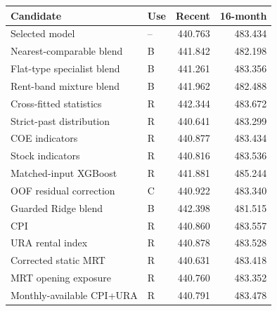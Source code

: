 \begin{tabular}{llrr}
\toprule
Candidate & Use & Recent & 16-month \\
\midrule
Selected model & -- & 440.763 & 483.434 \\
Nearest-comparable blend & B & 441.842 & 482.198 \\
Flat-type specialist blend & B & 441.261 & 483.356 \\
Rent-band mixture blend & B & 441.962 & 482.488 \\
Cross-fitted statistics & R & 442.344 & 483.672 \\
Strict-past distribution & R & 440.641 & 483.299 \\
COE indicators & R & 440.877 & 483.434 \\
Stock indicators & R & 440.816 & 483.536 \\
Matched-input XGBoost & R & 441.881 & 485.244 \\
OOF residual correction & C & 440.922 & 483.340 \\
Guarded Ridge blend & B & 442.398 & 481.515 \\
CPI & R & 440.860 & 483.557 \\
URA rental index & R & 440.878 & 483.528 \\
Corrected static MRT & R & 440.631 & 483.418 \\
MRT opening exposure & R & 440.760 & 483.352 \\
Monthly-available CPI+URA & R & 440.791 & 483.478 \\
\bottomrule
\end{tabular}
